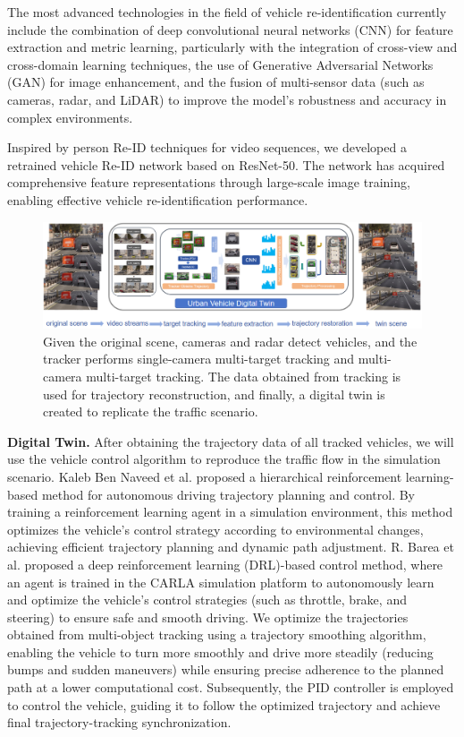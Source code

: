 \documentclass[lettersize,journal]{IEEEtran}
\begin{document}
The most advanced technologies in the field of vehicle re-identification currently include the combination of deep convolutional neural networks (CNN) for feature extraction and metric learning\cite{Alpher20g}, particularly with the integration of cross-view and cross-domain learning techniques, the use of Generative Adversarial Networks (GAN) for image enhancement\cite{Alpher21d}, and the fusion of multi-sensor data (such as cameras, radar, and LiDAR) to improve the model's robustness and accuracy in complex environments\cite{Alpher22g}.

Inspired by person Re-ID techniques for video sequences, we developed a retrained vehicle Re-ID network based on ResNet-50. 
The network has acquired comprehensive feature representations through large-scale image training, enabling effective vehicle re-identification performance.

\begin{figure}[t]
	\centering
	\includegraphics[width=\textwidth]{picture/picture2.png} 
	\caption{Given the original scene, cameras and radar detect vehicles, and the tracker performs single-camera multi-target tracking and multi-camera multi-target tracking. The data obtained from tracking is used for trajectory reconstruction, and finally, a digital twin is created to replicate the traffic scenario.}
	\label{fig:example}
\end{figure}

\textbf{Digital Twin.}
After obtaining the trajectory data of all tracked vehicles, we will use the vehicle control algorithm to reproduce the traffic flow in the simulation scenario.
Kaleb Ben Naveed et al. proposed a hierarchical reinforcement learning-based method for autonomous driving trajectory planning and control. 
By training a reinforcement learning agent in a simulation environment, this method optimizes the vehicle's control strategy according to environmental changes, achieving efficient trajectory planning and dynamic path adjustment.\cite{Alpher22}
R. Barea et al. proposed a deep reinforcement learning (DRL)-based control method, where an agent is trained in the CARLA simulation platform to autonomously learn and optimize the vehicle's control strategies (such as throttle, brake, and steering) to ensure safe and smooth driving.\cite{Alpher21}
We optimize the trajectories obtained from multi-object tracking using a trajectory smoothing algorithm, enabling the vehicle to turn more smoothly and drive more steadily (reducing bumps and sudden maneuvers) while ensuring precise adherence to the planned path at a lower computational cost. 
Subsequently, the PID controller is employed to control the vehicle, guiding it to follow the optimized trajectory and achieve final trajectory-tracking synchronization.
\end{document}
